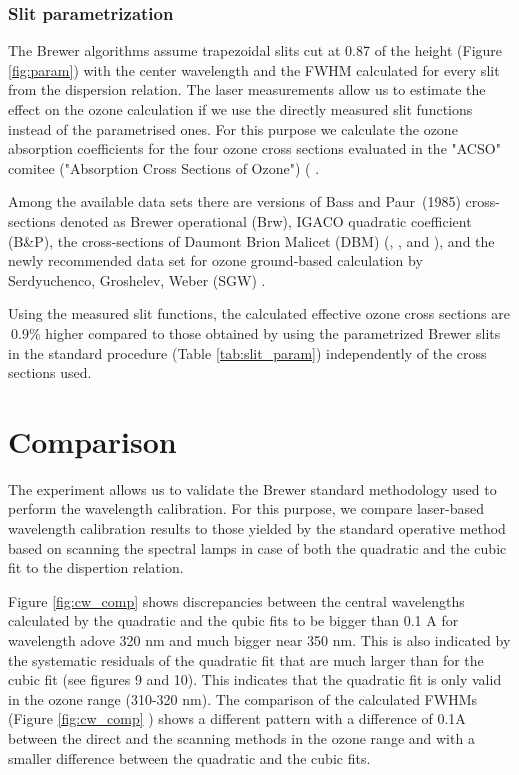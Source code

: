 \documentclass[acp, manuscript]{copernicus}
\begin{document}
\subsubsection{Slit parametrization }

The Brewer algorithms assume trapezoidal slits cut at 0.87 of the height (Figure \ref{fig:param}) with the  center wavelength and the FWHM calculated for every slit from the dispersion relation. The laser measurements allow us to estimate the effect on the ozone calculation if we use the directly measured slit functions instead of the parametrised ones. For this purpose we calculate the ozone absorption coefficients for the four ozone cross sections evaluated in the  "ACSO" comitee ("Absorption Cross Sections of Ozone") ( \citet{orphal2016absorption}.

Among the available data sets there are versions of Bass and Paur~(1985) cross-sections denoted as Brewer operational (Brw), IGACO quadratic coefficient (B\&P), the cross-sections of  Daumont Brion Malicet (DBM) (\citet{ daumont_ozone_1992}, \citet{brion_high-resolution_1993}, and \citet{malicet_ozone_1995} ), and the newly recommended data set for ozone ground-based calculation by Serdyuchenco, Groshelev, Weber (SGW) \citep{serdyuchenko_high_2012,gorshelev_high_2012,amt-9-4459-2016}. 


Using the measured slit functions, the calculated effective ozone cross sections are $~0.9\%$ higher compared to those obtained by using the parametrized Brewer slits in the standard procedure (Table \ref{tab:slit_param}) independently of the cross sections used.


\section{Comparison }

The experiment allows us to validate the Brewer standard methodology used to perform the wavelength calibration. For this purpose, we compare laser-based wavelength calibration results to those yielded by the standard operative method based on scanning the spectral lamps in case of both the quadratic and the cubic fit to the dispertion relation.

Figure \ref{fig:cw_comp} shows discrepancies between the central wavelengths calculated by the quadratic and the qubic fits to be bigger than 0.1 A for wavelength adove 320 \unit{nm} and much bigger near 350 nm. This is  also indicated by the systematic residuals of the quadratic fit that are much larger than for the cubic fit (see figures 9 and 10). This indicates that the quadratic fit is only valid in the ozone range (310-320 nm). The comparison of the calculated FWHMs (Figure \ref{fig:cw_comp} ) shows a different pattern with a difference of 0.1A between the direct and the scanning methods in the ozone range and with a smaller difference between the quadratic and the cubic fits.  
\end{document}
